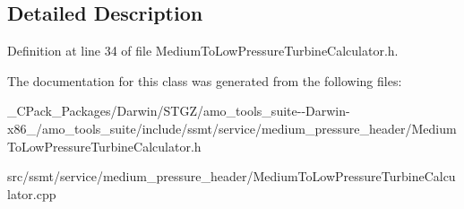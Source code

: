 \subsection{Detailed Description}


Definition at line 34 of file Medium\+To\+Low\+Pressure\+Turbine\+Calculator.\+h.



The documentation for this class was generated from the following files\+:\begin{DoxyCompactItemize}
\item 
\+\_\+\+C\+Pack\+\_\+\+Packages/\+Darwin/\+S\+T\+G\+Z/amo\+\_\+tools\+\_\+suite-\/-\/\+Darwin-\/x86\+\_/amo\+\_\+tools\+\_\+suite/include/ssmt/service/medium\+\_\+pressure\+\_\+header/Medium\+To\+Low\+Pressure\+Turbine\+Calculator.\+h\item 
src/ssmt/service/medium\+\_\+pressure\+\_\+header/Medium\+To\+Low\+Pressure\+Turbine\+Calculator.\+cpp\end{DoxyCompactItemize}
